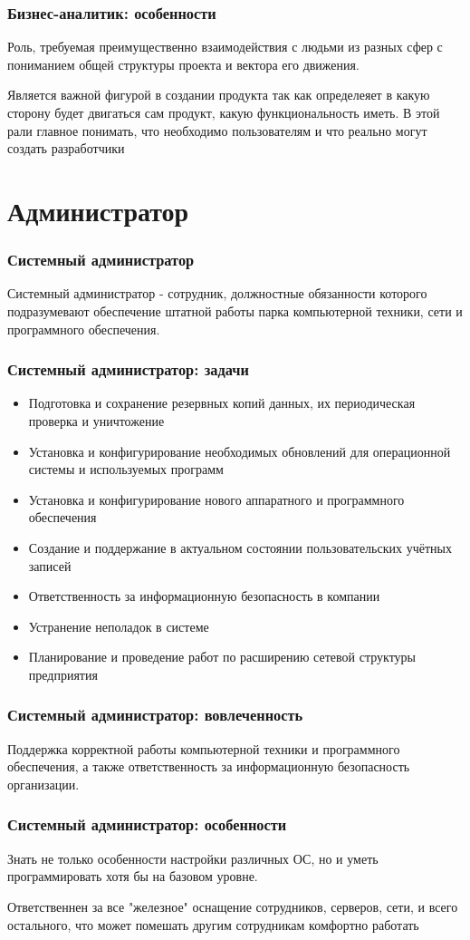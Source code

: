 \documentclass{../industrial-development}
\begin{document}
	\begin{frame} \frametitle{Бизнес-аналитик: особенности}
		Роль, требуемая преимущественно взаимодействия с людьми из разных сфер с пониманием общей структуры проекта и вектора его движения. 
	\end{frame}
	
	\lecturenotes
		 Является важной фигурой в создании продукта так как определеяет в какую сторону будет двигаться сам продукт, какую функциональность иметь. В этой рали главное понимать, что необходимо пользователям и что реально могут создать разработчики
	
	\section{Администратор} 
	
	\begin{frame} \frametitle{Системный администратор}
		\begin{block}{}
			\alert {Системный администратор} - сотрудник, должностные обязанности которого подразумевают обеспечение штатной работы парка компьютерной техники, сети и программного обеспечения.
		\end{block}
	\end{frame}
	
	\begin{frame} \frametitle{Системный администратор: задачи}
		\begin{itemize}
			\item Подготовка и сохранение резервных копий данных, их периодическая проверка и уничтожение
			\item Установка и конфигурирование необходимых обновлений для операционной системы и используемых программ
			\item Установка и конфигурирование нового аппаратного и программного обеспечения
			\item Создание и поддержание в актуальном состоянии пользовательских учётных записей
			\item Ответственность за информационную безопасность в компании
			\item Устранение неполадок в системе
			\item Планирование и проведение работ по расширению сетевой структуры предприятия
		\end{itemize}
	\end{frame}
	\begin{frame} \frametitle{Системный администратор: вовлеченность}
		Поддержка корректной работы компьютерной техники и программного обеспечения, а также ответственность за информационную безопасность организации.
	\end{frame}
	
	\begin{frame} \frametitle{Системный администратор: особенности}
		Знать не только особенности настройки различных ОС, но и уметь программировать хотя бы на базовом уровне.
	\end{frame}

	\lecturenotes
		Ответственнен за все "железное" оснащение сотрудников, серверов, сети, и всего остального, что может помешать другим сотрудникам комфортно работать
	
\end{document}

